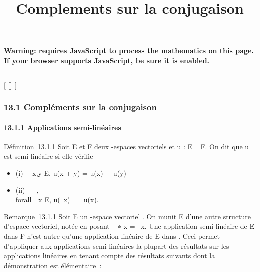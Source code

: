 \documentclass[]{article}
\title{Complements sur la conjugaison}
\author{}
\date{}
\begin{document}
\maketitle

\textbf{Warning: 
requires JavaScript to process the mathematics on this page.\\ If your
browser supports JavaScript, be sure it is enabled.}

\begin{center}\rule{3in}{0.4pt}\end{center}

[
[]
[

\subsubsection{13.1 Compléments sur la conjugaison}

\paragraph{13.1.1 Applications semi-linéaires}

Définition~13.1.1 Soit E et F deux -espaces vectoriels et u : E \rightarrow~ F. On
dit que u est semi-linéaire si elle vérifie

\begin{itemize}
\itemsep1pt\parskip0pt
\item
  (i) \forall~~x,y \in E, u(x + y) = u(x) + u(y)
\item
  (ii) \forall~\lambda~ \in {}, \\forall~~x \in
  E, u(\lambda~x) = \overline\lambda~u(x).
\end{itemize}

Remarque~13.1.1 Soit E un -espace vectoriel . On munit E d'une autre
structure d'espace vectoriel, notée \checkE en posant
\lambda~ ∗ x = \overline\lambda~x. Une application semi-linéaire de
E dans F n'est autre qu'une application linéaire de E dans
\checkF. Ceci permet d'appliquer aux applications
semi-linéaires la plupart des résultats sur les applications linéaires
en tenant compte des résultats suivants dont la démonstration est
élémentaire~:
\end{document}
